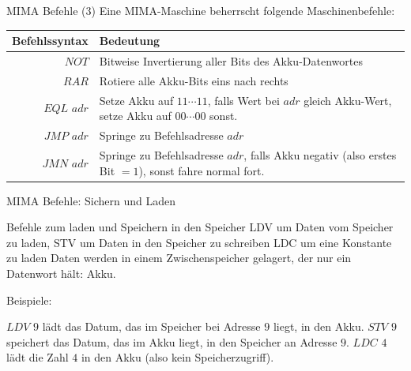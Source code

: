 \begin{frame}{MIMA Befehle (3)}
	Eine MIMA-Maschine beherrscht folgende Maschinenbefehle:
	
	\vspace{.5cm}
	
	\begin{tabular}{r | p{8cm} }
		Befehlssyntax & Bedeutung\\\hline\hline \ip
		$NOT$ & Bitweise Invertierung aller Bits des Akku-Datenwortes\\\hline\ip
		$RAR$ & Rotiere alle Akku-Bits eins nach rechts\\\hline\ip
		$EQL$ $adr$ & Setze Akku auf $11\cdots11$, falls Wert bei $adr$ gleich Akku-Wert, setze Akku auf $00\cdots00$ sonst.\\\hline\ip
		$JMP$ $adr$ & Springe zu Befehlsadresse $adr$\\\hline\ip
		$JMN$ $adr$ & Springe zu Befehlsadresse $adr$, falls Akku negativ (also erstes Bit $=1$), sonst fahre normal fort.
	\end{tabular}
\end{frame}


\begin{frame}{MIMA Befehle: Sichern und Laden}
	\begin{itemize}
		\pitem Befehle zum laden und Speichern in den Speicher
		\pitem LDV um Daten vom Speicher zu laden, STV um Daten in den Speicher zu schreiben
		\pitem LDC um eine Konstante zu laden
		\pitem Daten werden in einem Zwischenspeicher gelagert, der nur ein Datenwort hält\ip : Akku.
	\end{itemize}

	\bp

	Beispiele:
	
	\begin{itemize}
		\pitem $LDV$ $9$ lädt das Datum, das im Speicher bei Adresse $9$ liegt, in den Akku.
		\pitem $STV$ $9$ speichert das Datum, das im Akku liegt, in den Speicher an Adresse $9$.
		\pitem $LDC$ $4$ lädt die Zahl $4$ in den Akku (also kein Speicherzugriff).
	\end{itemize}
\end{frame}

